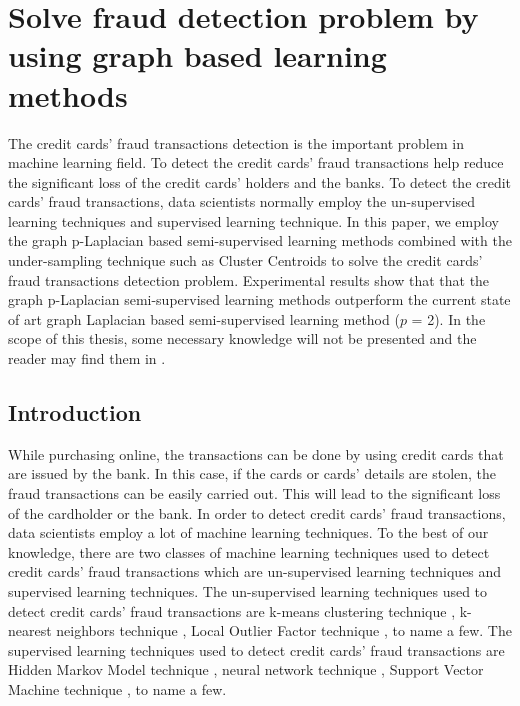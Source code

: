 \chapter{Solve fraud detection problem by using graph based learning methods}

\ifpdf
    \graphicspath{{Chapter1/Figs/Raster/}{Chapter1/Figs/PDF/}{Chapter1/Figs/}}
\else
    \graphicspath{{Chapter1/Figs/Vector/}{Chapter1/Figs/}}
\fi


The credit cards’ fraud transactions detection is the important problem in machine learning field. To detect the credit cards’ fraud transactions help reduce the significant loss of the credit cards’ holders and the banks. To detect the credit cards’ fraud transactions, data scientists normally employ the un-supervised learning techniques and supervised learning technique. In this paper, we employ the graph p-Laplacian based semi-supervised learning methods combined with the under-sampling technique such as Cluster Centroids to solve the credit cards’ fraud transactions detection problem. Experimental results show that that the graph p-Laplacian semi-supervised learning methods outperform the current state of art graph Laplacian based semi-supervised learning method ($p$ = 2). In the scope of this thesis, some necessary knowledge will not be presented and the reader may find them in \citep{tran2012application, latouche2015graphs}.


\section{Introduction}

While purchasing online, the transactions can be done by using credit cards that are issued by the bank. In this case, if the cards or cards’ details are stolen, the fraud transactions can be easily carried out. This will lead to the significant loss of the cardholder or the bank. In order to detect credit cards’ fraud transactions, data scientists employ a lot of machine learning techniques. To the best of our knowledge, there are two classes of machine learning techniques used to detect credit cards’ fraud transactions which are un-supervised learning techniques and supervised learning techniques. The un-supervised learning techniques used to detect credit cards’ fraud transactions are k-means clustering technique \citep{goldstein2016comparative}, k-nearest neighbors technique \citep{goldstein2016comparative}, Local Outlier Factor technique \citep{goldstein2016comparative}, to name a few. The supervised learning techniques used to detect credit cards’ fraud transactions are Hidden Markov Model technique \citep{singh2012survey}, neural network technique \citep{nune2015novel}, Support Vector Machine technique \citep{csahin2011detecting}, to name a few.

